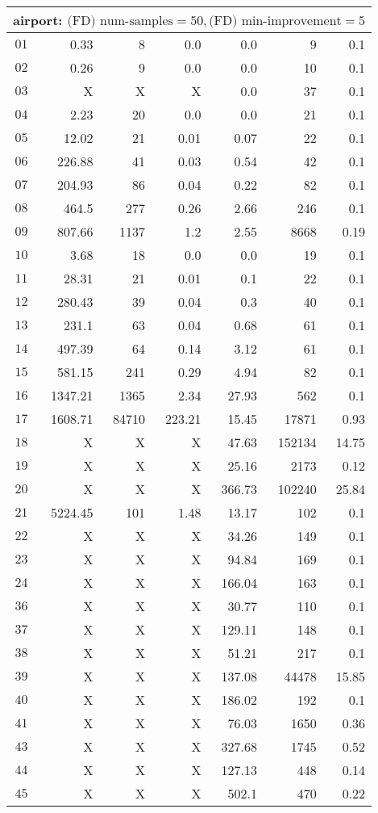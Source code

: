 \begin{longtable}{|c||r|r|r||r|r|r|}
\multicolumn{7}{|l|}{airport: $\text{(FD) num-samples}=50,\text{(FD) min-improvement}=5$}\\\hline
$01$ & 0.33 & 8 & 0.0 & 0.0 & 9 & 0.1 \\\hline
$02$ & 0.26 & 9 & 0.0 & 0.0 & 10 & 0.1 \\\hline
$03$ &  X &  X &  X & 0.0 & 37 & 0.1 \\\hline
$04$ & 2.23 & 20 & 0.0 & 0.0 & 21 & 0.1 \\\hline
$05$ & 12.02 & 21 & 0.01 & 0.07 & 22 & 0.1 \\\hline
$06$ & 226.88 & 41 & 0.03 & 0.54 & 42 & 0.1 \\\hline
$07$ & 204.93 & 86 & 0.04 & 0.22 & 82 & 0.1 \\\hline
$08$ & 464.5 & 277 & 0.26 & 2.66 & 246 & 0.1 \\\hline
$09$ & 807.66 & 1137 & 1.2 & 2.55 & 8668 & 0.19 \\\hline
$10$ & 3.68 & 18 & 0.0 & 0.0 & 19 & 0.1 \\\hline
$11$ & 28.31 & 21 & 0.01 & 0.1 & 22 & 0.1 \\\hline
$12$ & 280.43 & 39 & 0.04 & 0.3 & 40 & 0.1 \\\hline
$13$ & 231.1 & 63 & 0.04 & 0.68 & 61 & 0.1 \\\hline
$14$ & 497.39 & 64 & 0.14 & 3.12 & 61 & 0.1 \\\hline
$15$ & 581.15 & 241 & 0.29 & 4.94 & 82 & 0.1 \\\hline
$16$ & 1347.21 & 1365 & 2.34 & 27.93 & 562 & 0.1 \\\hline
$17$ & 1608.71 & 84710 & 223.21 & 15.45 & 17871 & 0.93 \\\hline
$18$ &  X &  X &  X & 47.63 & 152134 & 14.75 \\\hline
$19$ &  X &  X &  X & 25.16 & 2173 & 0.12 \\\hline
$20$ &  X &  X &  X & 366.73 & 102240 & 25.84 \\\hline
$21$ & 5224.45 & 101 & 1.48 & 13.17 & 102 & 0.1 \\\hline
$22$ &  X &  X &  X & 34.26 & 149 & 0.1 \\\hline
$23$ &  X &  X &  X & 94.84 & 169 & 0.1 \\\hline
$24$ &  X &  X &  X & 166.04 & 163 & 0.1 \\\hline
$36$ &  X &  X &  X & 30.77 & 110 & 0.1 \\\hline
$37$ &  X &  X &  X & 129.11 & 148 & 0.1 \\\hline
$38$ &  X &  X &  X & 51.21 & 217 & 0.1 \\\hline
$39$ &  X &  X &  X & 137.08 & 44478 & 15.85 \\\hline
$40$ &  X &  X &  X & 186.02 & 192 & 0.1 \\\hline
$41$ &  X &  X &  X & 76.03 & 1650 & 0.36 \\\hline
$43$ &  X &  X &  X & 327.68 & 1745 & 0.52 \\\hline
$44$ &  X &  X &  X & 127.13 & 448 & 0.14 \\\hline
$45$ &  X &  X &  X & 502.1 & 470 & 0.22 \\\hline


\end{longtable}
